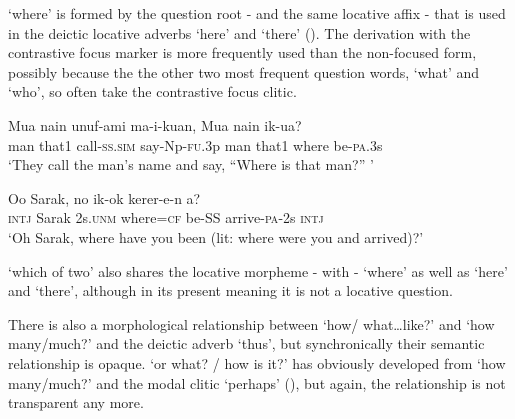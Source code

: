  `where' is formed by the question root - and the same locative affix - that is used in the deictic locative adverbs  `here' and  `there' (). The derivation with the contrastive focus marker  is more frequently used than the non-focused form, possibly because the the other two most frequent question words,  `what' and  `who', so often take the contrastive focus clitic. 

\ea%
\label{ex:x1852}
\gll Mua nain unuf-ami ma-i-kuan, {\textquotedbl}Mua nain  ik-ua?{\textquotedbl} \\
man that1 call-\textsc{ss}.\textsc{sim} say-Np-\textsc{fu}.3p man that1 where be-\textsc{pa}.3s\\
\glt`They call the man's name and say, ``Where is that man?'' '
\z

\ea%
\label{ex:x1854}
\gll Oo Sarak, no  ik-ok kerer-e-n a? \\
\textsc{intj} Sarak 2s.\textsc{unm} where=\textsc{cf} be-SS arrive-\textsc{pa}-2s \textsc{intj}\\
\glt`Oh Sarak, where have you been (lit: where were you and arrived)?'
\z

 `which of two' also shares the locative morpheme - with - `where' as well as  `here' and  `there', although in its present meaning it is not a locative question.

There is also a morphological relationship between  `how/ what{\dots}like?' and  `how many/much?' and the deictic adverb  `thus', but synchronically their semantic relationship is opaque.  `or what? / how is it?' has obviously developed from  `how many/much?' and the modal clitic  `perhaps' (), but again, the relationship is not transparent any more.

